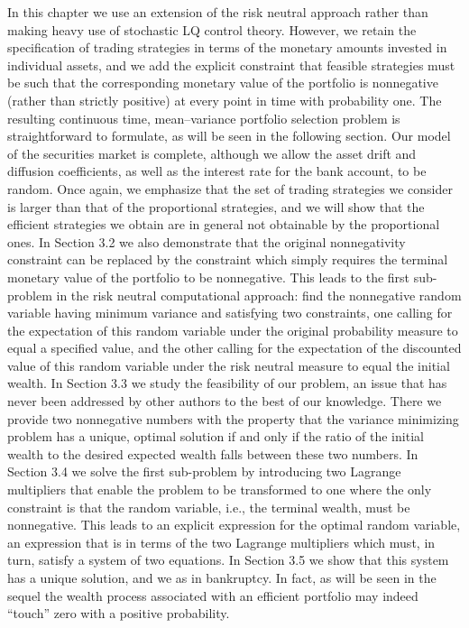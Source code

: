 In this chapter we use an extension of the risk neutral approach rather than making heavy use of stochastic LQ control theory. However, we retain the specification of trading strategies in terms of the monetary amounts invested in individual assets, and we add the explicit constraint that feasible strategies must be such that the corresponding monetary value of the portfolio is nonnegative (rather than strictly positive) at every point in time with probability one. The resulting continuous time, mean–variance portfolio selection problem is straightforward to formulate, as will be seen in the following section. Our model of the securities market is complete, although we allow the asset drift and diffusion coefficients, as well as the interest rate for the bank account, to be random. Once again, we emphasize that the set of trading strategies we consider is larger than that of the proportional strategies, and we will show that the efficient strategies we obtain are in general not obtainable by the proportional ones. In Section 3.2 we also demonstrate that the original nonnegativity constraint can be replaced by the constraint which simply requires the terminal monetary value of the portfolio to be nonnegative. This leads to the first sub-problem in the risk neutral computational approach: find the nonnegative random variable having minimum variance and satisfying two constraints, one calling for the expectation of this random variable under the original probability measure to equal a specified value, and the other calling for the expectation of the discounted value of this random variable under the risk neutral measure to equal the initial wealth.
In Section 3.3 we study the feasibility of our problem, an issue that has never been
addressed by other authors to the best of our knowledge. There we provide two nonnegative
numbers with the property that the variance minimizing problem has a unique, optimal
solution if and only if the ratio of the initial wealth to the desired expected wealth falls
between these two numbers. In Section 3.4 we solve the first sub-problem by introducing
two Lagrange multipliers that enable the problem to be transformed to one where the only
constraint is that the random variable, i.e., the terminal wealth, must be nonnegative.
This leads to an explicit expression for the optimal random variable, an expression that
is in terms of the two Lagrange multipliers which must, in turn, satisfy a system of
two equations. In Section 3.5 we show that this system has a unique solution, and we
as in bankruptcy. In fact, as will be seen in the sequel the wealth process associated with an efficient portfolio may indeed “touch” zero with a positive probability.

